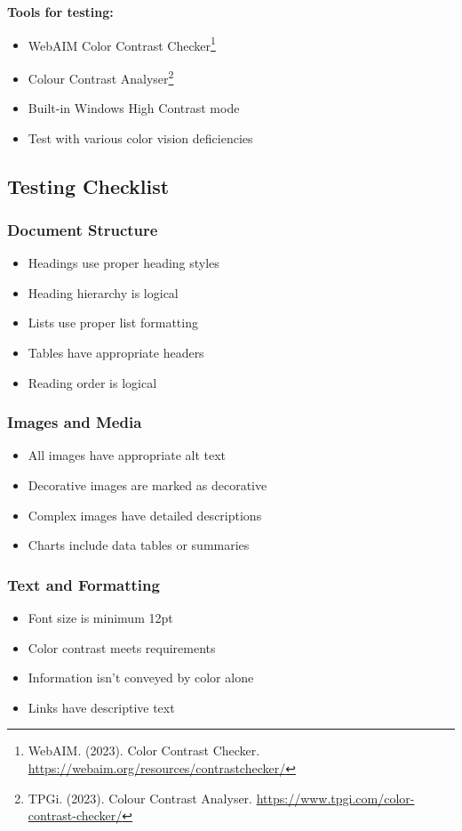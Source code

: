 \textbf{Tools for testing:}
\begin{itemize}
\item WebAIM Color Contrast Checker\footnote{WebAIM. (2023). Color Contrast Checker. \url{https://webaim.org/resources/contrastchecker/}}
\item Colour Contrast Analyser\footnote{TPGi. (2023). Colour Contrast Analyser. \url{https://www.tpgi.com/color-contrast-checker/}}
\item Built-in Windows High Contrast mode
\item Test with various color vision deficiencies
\end{itemize}

\subsection{Testing Checklist}

\subsubsection{Document Structure}
\begin{itemize}
\item[\checkmark] Headings use proper heading styles
\item[\checkmark] Heading hierarchy is logical
\item[\checkmark] Lists use proper list formatting
\item[\checkmark] Tables have appropriate headers
\item[\checkmark] Reading order is logical
\end{itemize}

\subsubsection{Images and Media}
\begin{itemize}
\item[\checkmark] All images have appropriate alt text
\item[\checkmark] Decorative images are marked as decorative
\item[\checkmark] Complex images have detailed descriptions
\item[\checkmark] Charts include data tables or summaries
\end{itemize}

\subsubsection{Text and Formatting}
\begin{itemize}
\item[\checkmark] Font size is minimum 12pt
\item[\checkmark] Color contrast meets requirements
\item[\checkmark] Information isn't conveyed by color alone
\item[\checkmark] Links have descriptive text
\end{itemize}

